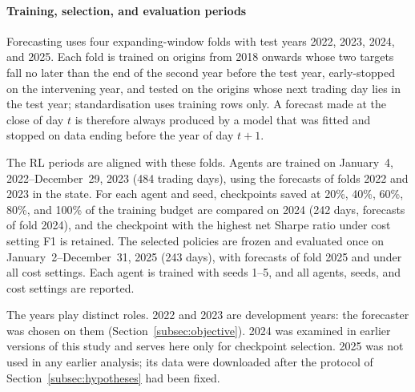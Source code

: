 \paragraph{Training, selection, and evaluation periods}
\label{subsec:splits}
{\color{blue}
Forecasting uses four expanding-window folds with test years 2022, 2023, 2024, and 2025. Each fold is trained on origins from 2018 onwards whose two targets fall no later than the end of the second year before the test year, early-stopped on the intervening year, and tested on the origins whose next trading day lies in the test year; standardisation uses training rows only. A forecast made at the close of day $t$ is therefore always produced by a model that was fitted and stopped on data ending before the year of day $t+1$.

The RL periods are aligned with these folds. Agents are trained on January~4, 2022--December~29, 2023 (484 trading days), using the forecasts of folds 2022 and 2023 in the state. For each agent and seed, checkpoints saved at 20\%, 40\%, 60\%, 80\%, and 100\% of the training budget are compared on 2024 (242 days, forecasts of fold 2024), and the checkpoint with the highest net Sharpe ratio under cost setting F1 is retained. The selected policies are frozen and evaluated once on January~2--December~31, 2025 (243 days), with forecasts of fold 2025 and under all cost settings. Each agent is trained with seeds 1--5, and all agents, seeds, and cost settings are reported.

The years play distinct roles. 2022 and 2023 are development years: the forecaster was chosen on them (Section~\ref{subsec:objective}). 2024 was examined in earlier versions of this study and serves here only for checkpoint selection. 2025 was not used in any earlier analysis; its data were downloaded after the protocol of Section~\ref{subsec:hypotheses} had been fixed.
\par}

